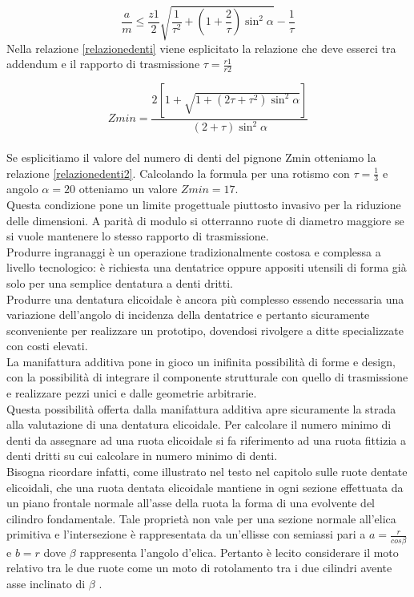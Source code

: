 \documentclass[%
corpo=11pt,
twoside,
 stile=classica,
oldstyle,
greek,%
]{toptesi}
\begin{document}
	\begin{equation}\label{relazionedenti}
	\frac{a}{m}\leq\frac{z1}{2}\sqrt{\frac{1}{\tau^2}+(1+\frac{2}{\tau})\sin^2\alpha} -\frac{1}{\tau}
	\end{equation}
	Nella relazione \ref{relazionedenti} viene esplicitato la relazione che deve esserci tra addendum e il rapporto di trasmissione $\tau=\frac{r1}{r2}$ 
	
	\begin{equation}\label{relazionedenti2}
	Zmin=\frac{2[1+\sqrt{1+(2\tau+\tau^2)\sin^2\alpha}]}{(2+\tau)\sin^2\alpha}
	\end{equation}
	\\Se esplicitiamo il valore del numero di denti del pignone Zmin otteniamo la relazione \ref{relazionedenti2}.
	Calcolando la formula per una rotismo con $\tau=\frac{1}{3}$ e angolo $\alpha=20$ otteniamo un valore $Zmin=17$.\\
	Questa condizione pone un limite progettuale piuttosto invasivo per la riduzione delle dimensioni. A parità di modulo si otterranno ruote di diametro maggiore se si vuole mantenere lo stesso rapporto di trasmissione. \\
	Produrre ingranaggi è un operazione tradizionalmente costosa e complessa a livello tecnologico: è richiesta una dentatrice oppure appositi utensili di forma già solo per una semplice dentatura a denti dritti. \\
	Produrre una dentatura elicoidale è ancora più complesso essendo necessaria una variazione dell'angolo di incidenza della dentatrice e pertanto sicuramente sconveniente per realizzare un prototipo, dovendosi rivolgere a ditte specializzate con costi elevati. \\
	La manifattura additiva pone in gioco un inifinita possibilità di forme e design, con la possibilità di integrare il componente strutturale con quello di trasmissione e realizzare pezzi unici e dalle geometrie arbitrarie. \\
	Questa possibilità offerta dalla manifattura additiva apre sicuramente la strada alla valutazione di una dentatura elicoidale. 
	Per calcolare il numero minimo di denti da assegnare ad una ruota elicoidale si fa riferimento ad una ruota fittizia a denti dritti su cui calcolare in numero minimo di denti.\\
	Bisogna ricordare infatti, come illustrato nel testo \cite{Jacazioteo} nel capitolo sulle ruote dentate elicoidali, che una ruota dentata elicoidale mantiene in ogni sezione effettuata da un piano frontale normale all'asse della ruota la forma di una evolvente del cilindro fondamentale. Tale proprietà non vale per una sezione normale all'elica primitiva e l'intersezione è rappresentata da un'ellisse con semiassi pari a $a=\frac{r}{cos\beta}$ e $b=r$ dove $\beta$ rappresenta l'angolo d'elica. 
	Pertanto è lecito considerare il moto relativo tra le due ruote come un moto di rotolamento tra i due cilindri avente asse inclinato di $\beta$ .
	
\end{document}
